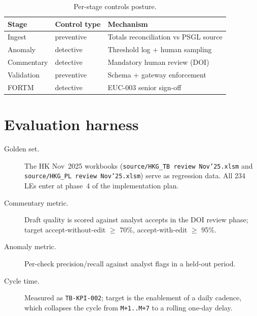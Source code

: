 \begin{table}[htbp]
\caption{Per-stage controls posture.}\label{tab:ai-controls}
\centering
\small
\begin{tabularx}{\linewidth}{@{}llX@{}}
\toprule
\textbf{Stage} & \textbf{Control type} & \textbf{Mechanism} \\ \midrule
Ingest        & preventive & Totals reconciliation vs PSGL source \\
Anomaly       & detective  & Threshold log + human sampling \\
Commentary    & detective  & Mandatory human review (DOI) \\
Validation    & preventive & Schema + gateway enforcement \\
FORTM         & detective  & EUC-003 senior sign-off \\
\bottomrule
\end{tabularx}
\end{table}

\section{Evaluation harness}

\begin{description}
  \item[Golden set.] The HK Nov~2025 workbooks
        (\corpus\texttt{source/HKG\_TB review Nov'25.xlsm} and
        \corpus\texttt{source/HKG\_PL review Nov'25.xlsm}) serve as
        regression data. All 234 LEs enter at phase~4 of the
        implementation plan.
  \item[Commentary metric.] Draft quality is scored against analyst
        accepts in the DOI review phase; target accept-without-edit
        $\ge$ 70\%, accept-with-edit $\ge$ 95\%.
  \item[Anomaly metric.] Per-check precision/recall against analyst
        flags in a held-out period.
  \item[Cycle time.] Measured as \texttt{TB-KPI-002}; target is the
        enablement of a daily cadence, which collapses the cycle from
        \texttt{M+1..M+7} to a rolling one-day delay.
\end{description}
